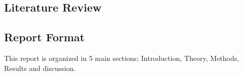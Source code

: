\subsection{Literature Review}

\subsection{Report Format}
This report is organized in 5 main sections; Introduction, Theory, Methods, Results and discussion.